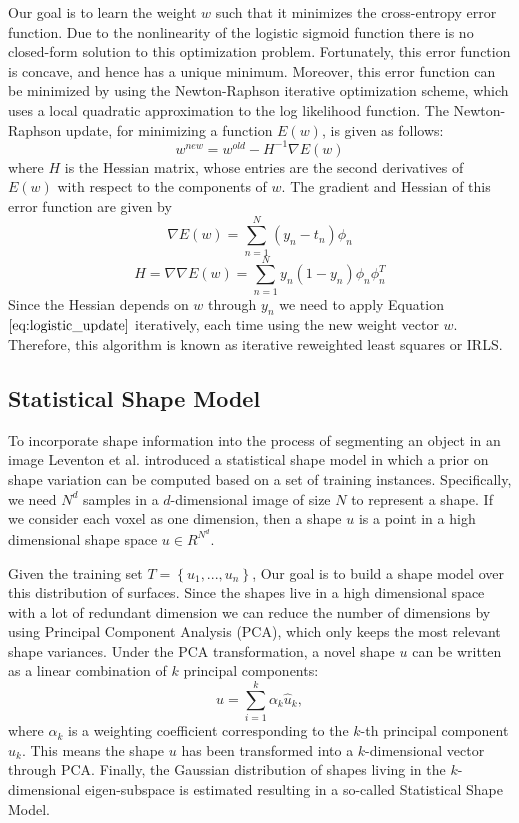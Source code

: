 \documentclass{SMBV13}
\begin{document}
Our goal is to learn the weight $w$ such that it minimizes the cross-entropy error function. Due to the nonlinearity of the logistic sigmoid function there is no closed-form solution to this optimization problem. Fortunately, this error function is concave, and hence has a unique minimum. Moreover, this error function can be minimized by using the Newton-Raphson iterative optimization scheme, which uses a local quadratic approximation to the log likelihood function. The Newton-Raphson update, for minimizing a function $E(w)$, is given as follows:
\begin{equation}
w^{new} = w^{old} - H^{-1} \nabla E(w)
\label{eq:logistic_update}
\end{equation}
where $H$ is the Hessian matrix, whose entries are the second derivatives of $E(w)$ with respect to the components of $w$. The gradient and Hessian of this error function are given by
\begin{equation}
\nabla E(w) = \sum\limits_{n = 1}^{N}(y_n - t_n) \phi_n %
\end{equation}
\begin{equation}
H = \nabla \nabla E(w) = \sum\limits_{n = 1}^{N} y_n(1 - y_n) \phi_n \phi_n^T %
\end{equation}
Since the Hessian depends on $w$ through $y_n$ we need to apply Equation $\ref{eq:logistic_update}$ iteratively, each time using the new weight vector $w$. Therefore, this algorithm is known as iterative reweighted least squares or IRLS.

\subsection{Statistical Shape Model}
\label{sec:SSM}
To incorporate shape information into the process of segmenting an object in an image Leventon et al. \cite{leventon2000statistical} introduced a statistical shape model in which a prior on shape variation can be computed based on a set of training instances. Specifically, we need $N^d$ samples in a $d$-dimensional image of size $N$ to represent a shape. If we consider each voxel as one dimension, then a shape $u$ is a point in a high dimensional shape space $u \in R^{N^d}$.

Given the training set $T = \left\lbrace u_1, ..., u_n \right\rbrace$, Our goal is to build a shape model over this distribution of surfaces. Since the shapes live in a high dimensional space with a lot of redundant dimension we can reduce the number of dimensions by using Principal Component Analysis (PCA), which only keeps the most relevant shape variances. Under the PCA transformation, a novel shape $u$ can be written as a linear combination of $k$ principal components:
\begin{equation}
u = \sum\limits_{i = 1}^{k} \alpha_k\hat{u}_k,
\end{equation}
where $\alpha_k$ is a weighting coefficient corresponding to the $k$-th principal component $\hat{u}_k$. This means the shape $u$ has been transformed into a $k$-dimensional vector through PCA. Finally, the Gaussian distribution of shapes living in the $k$-dimensional eigen-subspace is estimated resulting in a so-called Statistical Shape Model.
\end{document}
